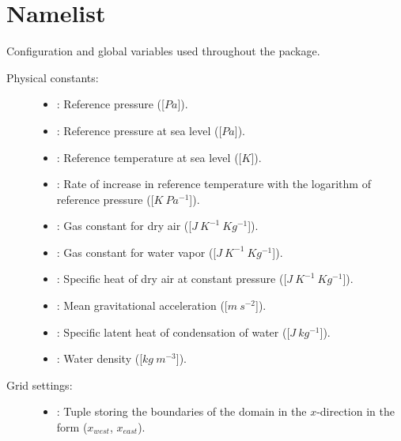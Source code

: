 \documentclass[letterpaper,10pt,english]{sphinxmanual}
\begin{document}
\section{Namelist}
\label{\detokenize{api:namelist}}\label{\detokenize{api:module-tasmania.namelist}}
Configuration and global variables used throughout the package.
\begin{description}
\item[{Physical constants:}] \leavevmode\begin{itemize}
\item {} 
: Reference pressure ({[}\(Pa\){]}).

\item {} 
: Reference pressure at sea level ({[}\(Pa\){]}).

\item {} 
: Reference temperature at sea level ({[}\(K\){]}).

\item {} 
: Rate of increase in reference temperature with the logarithm                 of reference pressure ({[}\(K ~ Pa^{-1}\){]}).

\item {} 
: Gas constant for dry air ({[}\(J ~ K^{-1} ~ Kg^{-1}\){]}).

\item {} 
: Gas constant for water vapor ({[}\(J ~ K^{-1} ~ Kg^{-1}\){]}).

\item {} 
: Specific heat of dry air at constant pressure ({[}\(J ~ K^{-1} ~ Kg^{-1}\){]}).

\item {} 
: Mean gravitational acceleration ({[}\(m ~ s^{-2}\){]}).

\item {} 
: Specific latent heat of condensation of water ({[}\(J ~ kg^{-1}\){]}).

\item {} 
: Water density ({[}\(kg ~ m^{-3}\){]}).

\end{itemize}

\item[{Grid settings:}] \leavevmode\begin{itemize}
\item {} 
: Tuple storing the boundaries of the domain in the                \(x\)-direction in the form (\(x_{west}\), \(x_{east}\)).


\end{itemize}
\end{description}
\end{document}
